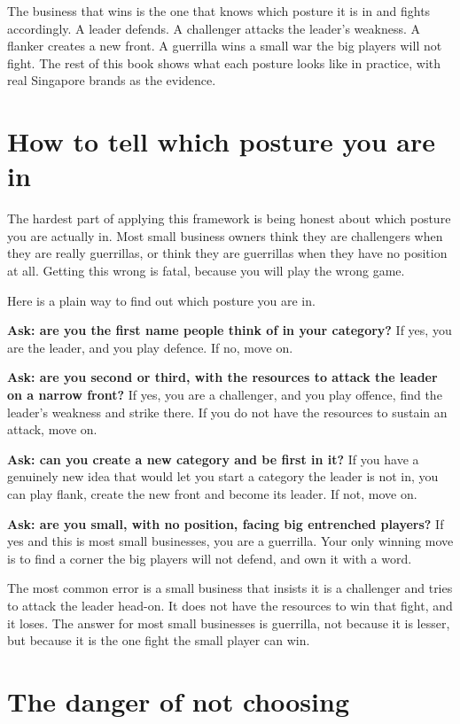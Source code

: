 \documentclass[10pt,twoside,openany]{memoir}
\newcommand{\needspacehead}{\needspace{4\baselineskip}}
\let\oldsection\section
\renewcommand{\section}{\needspacehead\oldsection}
\begin{document}
{The business that wins is the one that knows which posture it is in and
fights accordingly. A leader defends. A challenger attacks the leader's
weakness. A flanker creates a new front. A guerrilla wins a small war
the big players will not fight. The rest of this book shows what each
posture looks like in practice, with real Singapore brands as the
evidence.

\section{How to tell which posture you are
in}\label{how-to-tell-which-posture-you-are-in}

The hardest part of applying this framework is being honest about which
posture you are actually in. Most small business owners think they are
challengers when they are really guerrillas, or think they are
guerrillas when they have no position at all. Getting this wrong is
fatal, because you will play the wrong game.

Here is a plain way to find out which posture you are in.

\textbf{Ask: are you the first name people think of in your category?}
If yes, you are the leader, and you play defence. If no, move on.

\textbf{Ask: are you second or third, with the resources to attack the
leader on a narrow front?} If yes, you are a challenger, and you play
offence, find the leader's weakness and strike there. If you do not have
the resources to sustain an attack, move on.

\textbf{Ask: can you create a new category and be first in it?} If you
have a genuinely new idea that would let you start a category the leader
is not in, you can play flank, create the new front and become its
leader. If not, move on.

\textbf{Ask: are you small, with no position, facing big entrenched
players?} If yes and this is most small businesses, you are a guerrilla.
Your only winning move is to find a corner the big players will not
defend, and own it with a word.

The most common error is a small business that insists it is a
challenger and tries to attack the leader head-on. It does not have the
resources to win that fight, and it loses. The answer for most small
businesses is guerrilla, not because it is lesser, but because it is the
one fight the small player can win.

\section{The danger of not choosing}\label{the-danger-of-not-choosing}

}
\end{document}
